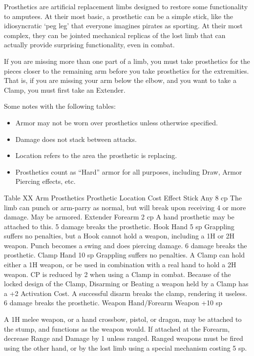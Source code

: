 \documentclass[oneside,11pt,english]{book}
\begin{document}
 

Prosthetics are artificial replacement limbs designed to restore some functionality to amputees. At their 
most basic, a prosthetic can be a simple stick, like the idiosyncratic ‘peg leg’ that everyone imagines 
pirates as sporting. At their most complex, they can be jointed mechanical replicas of the lost limb that 
can actually provide surprising functionality, even in combat. 

 

If you are missing more than one part of a limb, you must take prosthetics for the pieces closer to the 
remaining arm before you take prosthetics for the extremities. That is, if you are missing your arm below 
the elbow, and you want to take a Clamp, you must first take an Extender. 


 

Some notes with the following tables: 
\begin{itemize}
\item Armor may not be worn over prosthetics unless otherwise specified. 
\item Damage does not stack between attacks. 
\item Location refers to the area the prosthetic is replacing. 
\item Prosthetics count as “Hard” armor for all purposes, including Draw, Armor Piercing effects, etc. 
\end{itemize}
 
Table XX Arm Prosthetics 
Prosthetic Location Cost Effect 
Stick Any 8 cp The limb can punch or arm-parry as normal, but will break upon 
receiving 4 or more damage. May be armored. 
Extender Forearm 2 cp A hand prosthetic may be attached to this. 5 damage breaks the 
prosthetic. 
Hook Hand 5 sp Grappling suffers no penalties, but a Hook cannot hold a weapon, 
including a 1H or 2H weapon. Punch becomes a swing and does 
piercing damage. 6 damage breaks the prosthetic. 
Clamp Hand 10 sp Grappling suffers no penalties. A Clamp can hold either a 1H weapon, 
or be used in combination with a real hand to hold a 2H weapon. CP 
is reduced by 2 when using a Clamp in combat. 
Because of the locked design of the Clamp, Disarming or Beating a 
weapon held by a Clamp has a +2 Activation Cost. 
A successful disarm breaks the clamp, rendering it useless. 6 damage 
breaks the prosthetic. 
Weapon Hand/Forearm Weapon 
+10 sp 

A 1H melee weapon, or a hand crossbow, pistol, or dragon, may be 
attached to the stump, and functions as the weapon would. If attached 
at the Forearm, decrease Range and Damage by 1 unless ranged. 
Ranged weapons must be fired using the other hand, or by the lost 
limb using a special mechanism costing 5 sp. 
\end{document}
